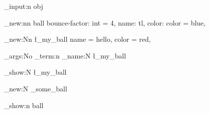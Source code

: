 \nonstopmode  \relax \ExplSyntaxOn %


\file_input:n { obj }

\obj_new:nn { ball }
  {
    bounce-factor: int = 4,
    name: tl,
    color: color = blue,
  }

\ball_new:Nn \l_my_ball
  {
    name = hello,
    color = red,
  }

\exp_args:No \msg_term:n { \ball_name:N \l_my_ball }

\prop_show:N \l_my_ball


\ball_new:N \g_some_ball

\obj_show:n { ball }

\bye
